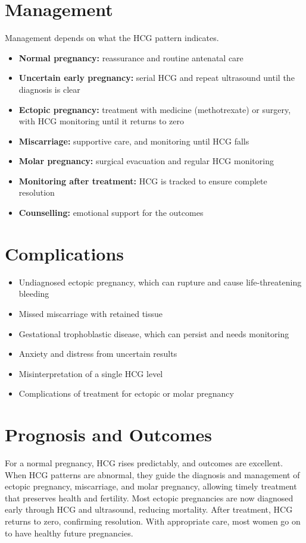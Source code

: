 \section*{Management}
Management depends on what the HCG pattern indicates.

\begin{itemize}
    \item \textbf{Normal pregnancy:} reassurance and routine antenatal care
    \item \textbf{Uncertain early pregnancy:} serial HCG and repeat ultrasound until the diagnosis is clear
    \item \textbf{Ectopic pregnancy:} treatment with medicine (methotrexate) or surgery, with HCG monitoring until it returns to zero
    \item \textbf{Miscarriage:} supportive care, and monitoring until HCG falls
    \item \textbf{Molar pregnancy:} surgical evacuation and regular HCG monitoring
    \item \textbf{Monitoring after treatment:} HCG is tracked to ensure complete resolution
    \item \textbf{Counselling:} emotional support for the outcomes
\end{itemize}

\section*{Complications}
\begin{itemize}
    \item Undiagnosed ectopic pregnancy, which can rupture and cause life-threatening bleeding
    \item Missed miscarriage with retained tissue
    \item Gestational trophoblastic disease, which can persist and needs monitoring
    \item Anxiety and distress from uncertain results
    \item Misinterpretation of a single HCG level
    \item Complications of treatment for ectopic or molar pregnancy
\end{itemize}

\section*{Prognosis and Outcomes}
For a normal pregnancy, HCG rises predictably, and outcomes are excellent. When HCG patterns are abnormal, they guide the diagnosis and management of ectopic pregnancy, miscarriage, and molar pregnancy, allowing timely treatment that preserves health and fertility. Most ectopic pregnancies are now diagnosed early through HCG and ultrasound, reducing mortality. After treatment, HCG returns to zero, confirming resolution. With appropriate care, most women go on to have healthy future pregnancies.

